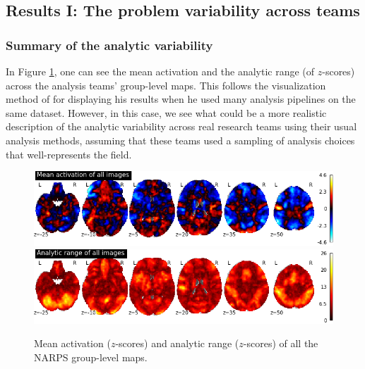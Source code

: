 \documentclass[a4paper,doc,natbib]{apa6}
\begin{document}
\subsection{Results I: The problem variability across teams}

\subsubsection{Summary of the analytic variability}
In Figure \ref{fig:1Amaps}, one can see the mean activation and the analytic range (of $z$-scores) across the analysis teams' group-level maps. This follows the visualization method of \cite{carp_plurality_2012} for displaying his results when he used many analysis pipelines on the same dataset. However, in this case, we see what could be a more realistic description of the analytic variability across real research teams using their usual analysis methods, assuming that these teams used a sampling of analysis choices that well-represents the field. 

\begin{figure}[!htb]
	\includegraphics[width=\textwidth]
	{figures/results1B_hypo1_Mean-activation-of-all-images.png}
	\includegraphics[width=\textwidth]
	{figures/results1B_hypo1_Analytic-range-of-all-images.png}
	\caption{\label{fig:1Amaps} Mean activation ($z$-scores) and analytic range ($z$-scores) of all the NARPS group-level maps.}
\end{figure}
\end{document}

